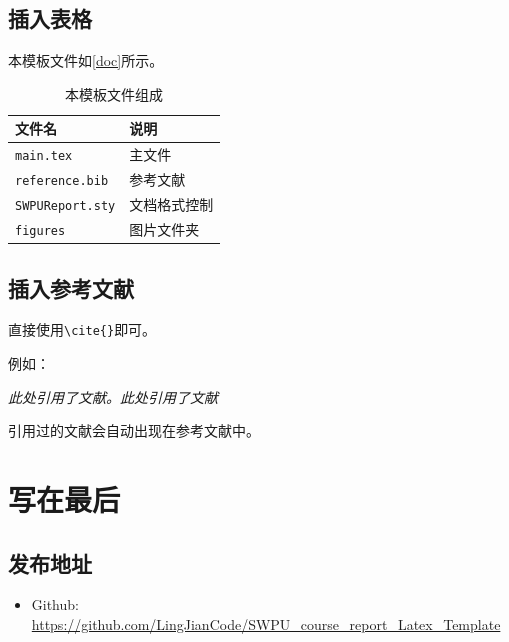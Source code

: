 \documentclass[12pt,hyperref,a4paper,UTF8]{ctexart}
\begin{document}
\subsection{插入表格}
本模板文件如\autoref{doc}所示。
\begin{table}[!htbp]
    \centering
    \begin{tabular}{l  | l}
    \hline
        文件名 & 说明 \\
        \hline
        \texttt{main.tex}  & 主文件 \\
        \texttt{reference.bib} & 参考文献 \\
        \texttt{SWPUReport.sty}  & 文档格式控制\\
        \texttt{figures}  & 图片文件夹 \\
        \hline
    \end{tabular}
    \caption{本模板文件组成}
    \label{doc}
\end{table}

%
%
%
%
%
%

\subsection{插入参考文献}
直接使用\verb|\cite{}|即可。

例如：


   \textit{ 此处引用了文献\cite{0Isaac}。此处引用了文献\cite{2016The}}


引用过的文献会自动出现在参考文献中。

\section{写在最后}
\subsection{发布地址}
\begin{itemize}
    \item Github: \url{https://github.com/LingJianCode/SWPU_course_report_Latex_Template}
\end{itemize}


\end{document}
